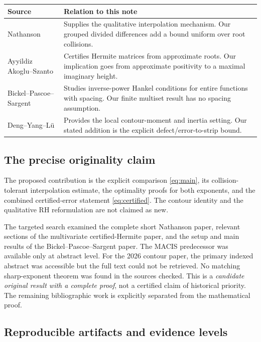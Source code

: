 \documentclass[11pt]{article}
\theoremstyle{definition}
\begin{document}
\begin{center}
\begin{tabularx}{\textwidth}{@{}>{\raggedright\arraybackslash}p{}>{\raggedright\arraybackslash}X@{}}
\toprule
Source & Relation to this note \\
\midrule
Nathanson & Supplies the qualitative interpolation mechanism. Our grouped
divided differences add a bound uniform over root collisions. \\
Ayyildiz Akoglu--Szanto & Certifies Hermite matrices from approximate roots.
Our implication goes from approximate positivity to a maximal imaginary height. \\
Bickel--Pascoe--Sargent & Studies inverse-power Hankel conditions for entire
functions with spacing. Our finite multiset result has no spacing assumption. \\
Deng--Yang--L\"u & Provides the local contour-moment and inertia setting.
Our stated addition is the explicit defect/error-to-strip bound. \\
\bottomrule
\end{tabularx}
\end{center}

\subsection{The precise originality claim}

The proposed contribution is the explicit comparison
\eqref{eq:main}, its collision-tolerant interpolation estimate, the
optimality proofs for both exponents, and the combined certified-error
statement \eqref{eq:certified}. The contour identity and the qualitative
RH reformulation are not claimed as new.

The targeted search examined the complete short Nathanson paper, relevant
sections of the multivariate certified-Hermite paper, and the setup and main
results of the Bickel--Pascoe--Sargent paper. The MACIS predecessor was
available only at abstract level. For the 2026 contour paper, the primary
indexed abstract was accessible but the full text could not be retrieved.
No matching sharp-exponent theorem was found in the sources checked.
This is a \emph{candidate original result with a complete proof}, not a
certified claim of historical priority. The remaining bibliographic work is
explicitly separated from the mathematical proof.

\subsection{Reproducible artifacts and evidence levels}
\end{document}
